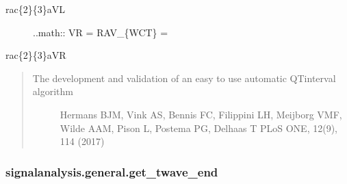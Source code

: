 \documentclass[letterpaper,10pt,english]{sphinxmanual}
\begin{document}
\begin{fulllineitems}
\begin{description}
\item[{rac\{2\}\{3\}aVL}] \leavevmode
\sphinxAtStartPar
..math:: VR = RA\sphinxhyphen{}V\_\{WCT\} =

\end{description}

\sphinxAtStartPar
rac\{2\}\{3\}aVR
\begin{quote}
\begin{description}
\item[{The development and validation of an easy to use automatic QT\sphinxhyphen{}interval algorithm}] \leavevmode
\sphinxAtStartPar
Hermans BJM, Vink AS, Bennis FC, Filippini LH, Meijborg VMF, Wilde AAM, Pison L, Postema PG, Delhaas T
PLoS ONE, 12(9), 1\textendash{}14 (2017)

\end{description}
\end{quote}

\end{fulllineitems}



\subsubsection{signalanalysis.general.get\_twave\_end}
\label{\detokenize{_autosummary/signalanalysis.general.get_twave_end:signalanalysis-general-get-twave-end}}\label{\detokenize{_autosummary/signalanalysis.general.get_twave_end::doc}}
\end{document}
